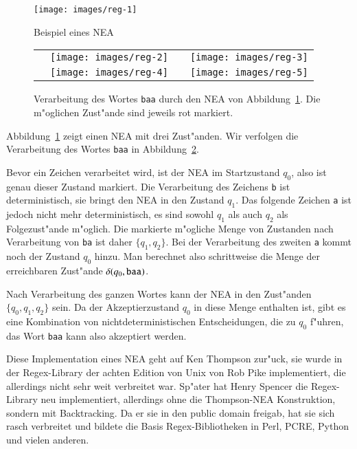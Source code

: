 \begin{figure}
\begin{center}
\texttt{[image: images/reg-1]}
\end{center}
\caption{Beispiel eines NEA\label{koenntenea}}
\end{figure}

\begin{figure}
\begin{center}
\begin{tabular}{cccc}
&%
\texttt{[image: images/reg-2]}&
\raisebox{60pt}{$\overset{\displaystyle\text{\tt b}}\longrightarrow$}&
\texttt{[image: images/reg-3]}\\
\raisebox{60pt}{$\overset{\displaystyle\text{\tt a}}\longrightarrow$}&
\texttt{[image: images/reg-4]}&
\raisebox{60pt}{$\overset{\displaystyle\text{\tt a}}\longrightarrow$}&
\texttt{[image: images/reg-5]}
\end{tabular}
\end{center}
\caption{Verarbeitung des Wortes {\tt baa} durch den NEA von
Abbildung~\ref{koenntenea}. Die m"oglichen Zust"ande sind jeweils
rot markiert.\label{koenntebeispiel}
}
\end{figure}
Abbildung~\ref{koenntenea} zeigt einen NEA mit drei Zust"anden.
Wir verfolgen die Verarbeitung des Wortes {\tt baa} in
Abbildung~\ref{koenntebeispiel}.

Bevor ein Zeichen verarbeitet wird,
ist der NEA im Startzustand $q_0$, also ist genau dieser Zustand
markiert. Die Verarbeitung des Zeichens {\tt b} ist deterministisch,
sie bringt den NEA in den Zustand $q_1$. Das folgende Zeichen {\tt a}
ist jedoch nicht mehr deterministisch, es sind sowohl $q_1$ als auch
$q_2$ als Folgezust"ande m"oglich. Die markierte m"ogliche Menge
von Zustanden nach Verarbeitung von {\tt ba} ist daher
$\{q_1,q_2\}$. Bei der Verarbeitung des zweiten {\tt a} kommt noch
der Zustand $q_0$ hinzu. Man berechnet also schrittweise die
Menge der erreichbaren Zust"ande $\delta(q_0,{\tt baa})$.

Nach Verarbeitung des ganzen Wortes kann der NEA in den Zust"anden
$\{q_0,q_1,q_2\}$ sein. Da der Akzeptierzustand $q_0$ in diese Menge
enthalten ist, gibt es eine Kombination von nichtdeterministischen
Entscheidungen, die zu $q_0$ f"uhren, das Wort {\tt baa} kann also
akzeptiert werden.

Diese Implementation eines NEA geht auf Ken Thompson zur"uck, sie wurde in
der Regex-Library der achten Edition von Unix von Rob Pike
 implementiert, die allerdings nicht sehr weit
verbreitet war. Sp"ater hat Henry Spencer die Regex-Library neu
implementiert, allerdings ohne die Thompson-NEA Konstruktion, sondern
mit Backtracking. Da er sie in den public domain freigab, hat sie sich
rasch verbreitet und bildete die Basis Regex-Bibliotheken in Perl, PCRE,
Python und vielen anderen.

